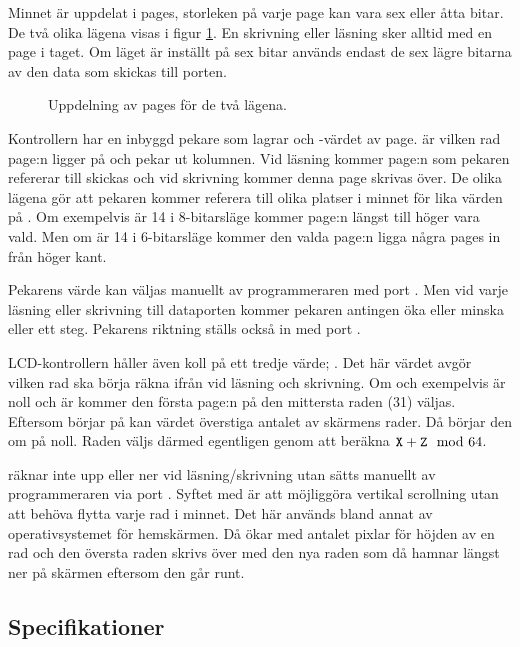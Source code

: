 \documentclass[main.tex]{subfiles}
\begin{document}
Minnet är uppdelat i pages, storleken på varje page kan vara sex eller åtta
bitar. De två olika lägena visas i figur \ref{fig:lcdpages}. En skrivning eller
läsning sker alltid med en page i taget. Om läget är inställt på sex bitar
används endast de sex lägre bitarna av den data som skickas till porten.

\begin{figure}[b]
    \centering
    
    \caption{Uppdelning av pages för de två lägena.}
    \label{fig:lcdpages}
\end{figure}

Kontrollern har en inbyggd pekare som lagrar  och -värdet av
page.  är vilken rad page:n ligger på och  pekar ut kolumnen.
Vid läsning kommer page:n som pekaren refererar till skickas och vid skrivning
kommer denna page skrivas över. De olika lägena gör att pekaren kommer referera
till olika platser i minnet för lika värden på . Om  exempelvis
är 14 i 8-bitarsläge kommer page:n längst till höger vara vald. Men om 
är 14 i 6-bitarsläge kommer den valda page:n ligga några pages in från höger
kant.

Pekarens värde kan väljas manuellt av programmeraren med port . Men
vid varje läsning eller skrivning till dataporten  kommer pekaren
antingen öka eller minska  eller  ett steg. Pekarens riktning
ställs också in med port .

LCD-kontrollern håller även koll på ett tredje värde; . Det här värdet
avgör vilken rad  ska börja räkna ifrån vid läsning och skrivning. Om
 och  exempelvis är noll och  är  kommer den
första page:n på den mittersta raden (31) väljas. Eftersom  börjar på
 kan värdet överstiga antalet av skärmens rader. Då börjar den om på
noll. Raden väljs därmed egentligen genom att beräkna $\texttt{X}+\texttt{Z} \mod
64$.

 räknar inte upp eller ner vid läsning/skrivning utan sätts manuellt av
programmeraren via port . Syftet med  är att möjliggöra
vertikal scrollning utan att behöva flytta varje rad i minnet. Det här används
bland annat av operativsystemet för hemskärmen. Då ökar  med antalet
pixlar för höjden av en rad och den översta raden skrivs över med den nya raden
som då hamnar längst ner på skärmen eftersom den går runt.

\subsection{Specifikationer}
\end{document}
